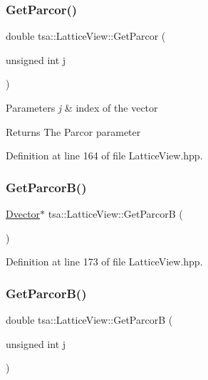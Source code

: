 \subsubsection{\texorpdfstring{Get\+Parcor()}{GetParcor()}}
{\footnotesize\ttfamily double tsa\+::\+Lattice\+View\+::\+Get\+Parcor (\begin{DoxyParamCaption}\item[{unsigned int}]{j }\end{DoxyParamCaption})\hspace{0.3cm}{\ttfamily [inline]}}


\begin{DoxyParams}{Parameters}
{\em j} & index of the vector \\
\hline
\end{DoxyParams}
\begin{DoxyReturn}{Returns}
The Parcor parameter 
\end{DoxyReturn}


Definition at line 164 of file Lattice\+View.\+hpp.

\mbox{\label{classtsa_1_1_lattice_view_a166491c83511a3c64ec63c1aa5e2cbbd}} 
\subsubsection{\texorpdfstring{Get\+Parcor\+B()}{GetParcorB()}\hspace{0.1cm}{\footnotesize\ttfamily [1/2]}}
{\footnotesize\ttfamily \hyperlink{namespacetsa_a8900fb03d849baf447a1a0efe2561fb2}{Dvector}$\ast$ tsa\+::\+Lattice\+View\+::\+Get\+ParcorB (\begin{DoxyParamCaption}{ }\end{DoxyParamCaption})\hspace{0.3cm}{\ttfamily [inline]}}



Definition at line 173 of file Lattice\+View.\+hpp.

\mbox{\label{classtsa_1_1_lattice_view_a14148e7fdd220c61791732bc14130bd9}} 
\subsubsection{\texorpdfstring{Get\+Parcor\+B()}{GetParcorB()}\hspace{0.1cm}{\footnotesize\ttfamily [2/2]}}
{\footnotesize\ttfamily double tsa\+::\+Lattice\+View\+::\+Get\+ParcorB (\begin{DoxyParamCaption}\item[{unsigned int}]{j }\end{DoxyParamCaption})\hspace{0.3cm}{\ttfamily [inline]}}


